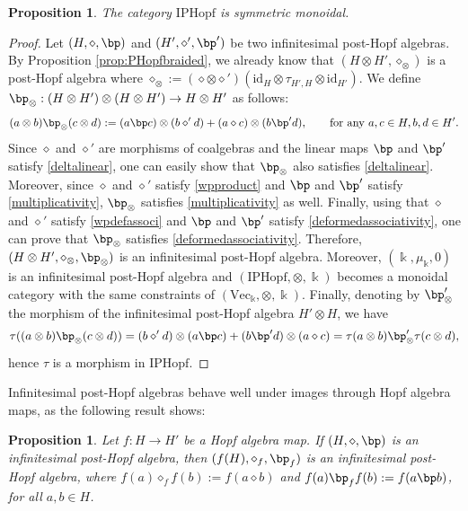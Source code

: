 \documentclass[10pt]{article}
\newtheorem {proposition} [lemma] {Proposition}
\theoremstyle{definition}
\renewcommand{\wp}{\diamond}
\newcommand{\ot}{\otimes}
\begin{document}
\begin{proposition}
The category $\mathrm{IPHopf}$ is symmetric monoidal.
\end{proposition}
\begin{proof}
Let $(H,\wp,\bp)$ and $(H',\wp',\bp')$ be two infinitesimal post-Hopf algebras. By Proposition \ref{prop:PHopfbraided}, we already know that $(H\ot H',\wp_{\ot})$ is a post-Hopf algebra where $\wp_{\ot}:=(\wp\ot\wp')(\mathrm{id}_{H}\ot\tau_{H',H}\ot\mathrm{id}_{H'})$.
We define $\bp_{\ot}:(H\ot H')\ot(H\ot H')\to H\ot H'$ as follows:
\[
(a\ot b)\bp_{\ot}(c\ot d):=(a\bp c)\ot(b\wp' d)+(a\wp c)\ot(b\bp' d),\qquad \text{for any } a,c\in H,b,d\in H'.
\]
Since $\wp$ and $\wp'$ are morphisms of coalgebras and the linear maps $\bp$ and $\bp'$ satisfy \eqref{deltalinear}, one can easily show that $\bp_{\ot}$ also satisfies \eqref{deltalinear}. 
Moreover, since $\wp$ and $\wp'$ satisfy \eqref{wpproduct} and $\bp$ and $\bp'$ satisfy \eqref{multiplicativity}, $\bp_{\ot}$ satisfies \eqref{multiplicativity} as well.
Finally, using that $\wp$ and $\wp'$ satisfy \eqref{wpdefassoci} and $\bp$ and $\bp'$ satisfy \eqref{deformedassociativity}, one can prove that $\bp_{\ot}$ satisfies \eqref{deformedassociativity}.
Therefore, $(H\ot H',\wp_{\ot},\bp_{\ot})$ is an infinitesimal post-Hopf algebra. Moreover, $(\Bbbk,\mu_{\Bbbk},0)$ is an infinitesimal post-Hopf algebra and $(\mathrm{IPHopf},\otimes,\Bbbk)$ becomes a monoidal category with the same constraints of $(\mathrm{Vec}_{\Bbbk},\ot,\Bbbk)$. 
Finally, denoting by $\bp'_{\ot}$ the morphism of the infinitesimal post-Hopf algebra $H'\ot H$, we have
\[
\tau((a\ot b)\bp_{\ot}(c\ot d))=(b\wp' d)\ot(a\bp c)+(b\bp' d)\ot(a\wp c)=\tau(a\ot b)\bp'_{\ot}\tau(c\ot d),
\]
hence $\tau$ is a morphism in $\mathrm{IPHopf}$. 
\end{proof}

Infinitesimal post-Hopf algebras behave well under images through Hopf algebra maps, as the following result shows:

\begin{proposition}
Let $f:H\to H'$ be a Hopf algebra map. If $(H,\wp,\bp)$ is an infinitesimal post-Hopf algebra, then $(f(H),\wp_f,\bp_f)$ is an infinitesimal post-Hopf algebra, where $f(a)\wp_{f}f(b):=f(a\wp b)$ and $f(a)\bp_{f}f(b):=f(a\bp b)$, for all $a,b\in H$.
\end{proposition}
\end{document}
